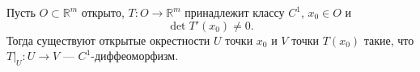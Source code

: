 \label{definition:05}

\begin{theorem}
Пусть $O\subset\mathbb R^m$ открыто, $T:O\to\mathbb R^m$ принадлежит классу $C^1$, $x_0\in O$ и
\[
  \det T'(x_0)\ne0.
\]
Тогда существуют открытые окрестности $U$ точки $x_0$ и $V$ точки $T(x_0)$ такие, что $T|_U:U\to V$ --- $C^1$-диффеоморфизм.
\end{theorem}
